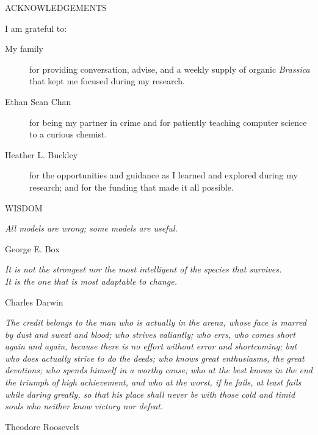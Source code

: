 \newpage
{}

\begin{center}
    ACKNOWLEDGEMENTS
\end{center}

\noindent I am grateful to:
\begin{description}
    \item[My family]
    	for providing conversation, advise, and a weekly supply of organic \textit{Brassica} that kept me focused during my research.
    \item[Ethan Sean Chan]
    	for being my partner in crime and for patiently teaching computer science to a curious chemist.
    \item[Heather L. Buckley]
    	for the opportunities and guidance as I learned and explored during my research; and for the funding that made it all possible.
\end{description}

\vspace{5mm}
\begin{center}
    WISDOM 
\end{center}

\vspace{3mm}
\begin{flushright} 
    \textit{All models are wrong; some models are useful.} \\
    \begin{flushright}
        George E. Box
    \end{flushright}
\end{flushright}

\vspace{3mm}
    \begin{flushright}
        \textit{
            It is not the strongest nor the most intelligent of the species that survives. \\
            It is the one that is most adaptable to change.
        } \\
    \begin{flushright}
        Charles Darwin
    \end{flushright}
\end{flushright}

\vspace{3mm}
\begin{justify}
    \textit{
        The credit belongs to the man who is actually in the arena, whose face is marred by dust and sweat and blood; who strives valiantly; who errs, who comes short again and again, because there is no effort without error and shortcoming; but who does actually strive to do the deeds; who knows great enthusiasms, the great devotions; who spends himself in a worthy cause; who at the best knows in the end the triumph of high achievement, and who at the worst, if he fails, at least fails while daring greatly, so that his place shall never be with those cold and timid souls who neither know victory nor defeat.
    } \\
    \begin{flushright}
        Theodore Roosevelt
    \end{flushright}
\end{justify}